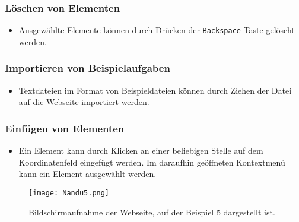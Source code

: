 \documentclass[a4paper,10pt,ngerman]{scrartcl}
\begin{document}
\subsubsection*{Löschen von Elementen}
\begin{itemize}
    \item Ausgewählte Elemente können durch Drücken der \texttt{Backspace}-Taste gelöscht werden.
\end{itemize}

\subsubsection*{Importieren von Beispielaufgaben}
\begin{itemize}
    \item Textdateien im Format von Beispieldateien können durch Ziehen der Datei auf die Webseite importiert werden.
\end{itemize}

\subsubsection*{Einfügen von Elementen}
\begin{itemize}
    \item Ein Element kann durch Klicken an einer beliebigen Stelle auf dem Koordinatenfeld eingefügt werden. Im daraufhin geöffneten Kontextmenü kann ein Element ausgewählt werden.
\end{itemize}

\begin{figure}[!ht]
    \centering
    \texttt{[image: Nandu5.png]}
    \caption{Bildschirmaufnahme der Webseite, auf der Beispiel 5 dargestellt ist.}
    \label{fig:nandu5}
\end{figure}
\end{document}
